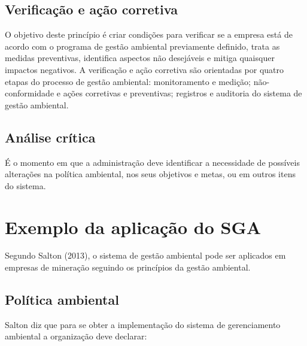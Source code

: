 \documentclass[a4paper, 12pt]{article}
\begin{document}
    \subsection{Verificação e ação corretiva}

    \par O objetivo deste princípio é criar condições para verificar se a empresa está de acordo com o programa de gestão ambiental previamente definido, trata as medidas preventivas, identifica aspectos não desejáveis e mitiga quaisquer impactos negativos. A verificação e ação corretiva são orientadas por quatro etapas do processo de gestão ambiental: monitoramento e medição; não-conformidade e ações corretivas e preventivas; registros e auditoria do sistema de gestão ambiental.

    \subsection{Análise crítica}

    \par É o momento em que a administração deve identificar a necessidade de possíveis alterações na política ambiental, nos seus objetivos e metas, ou em outros itens do sistema.

    \section{Exemplo da aplicação do SGA}

    \par Segundo Salton (2013), o sistema de gestão ambiental pode ser aplicados em empresas de mineração seguindo os princípios da gestão ambiental.

    \subsection{Política ambiental}
    
    \par Salton diz que para se obter a implementação do sistema de gerenciamento ambiental a organização deve declarar:
\end{document}
